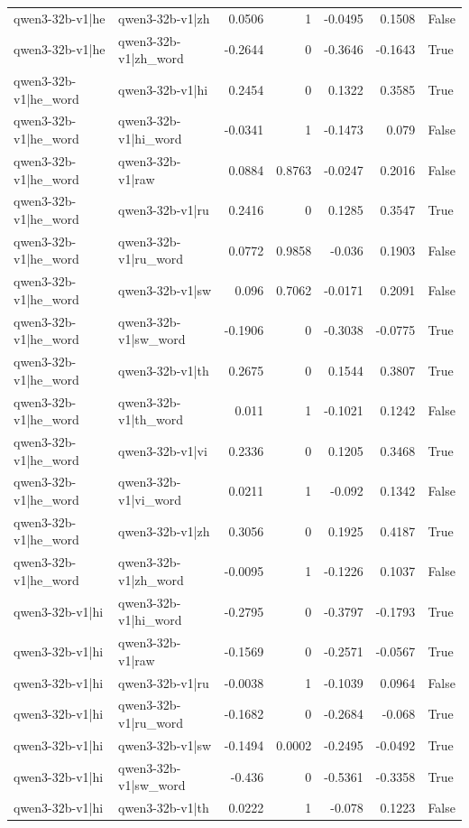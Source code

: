 \begin{table}
\begin{tabular}{l l r r r r l}
qwen3-32b-v1|he & qwen3-32b-v1|zh & 0.0506 & 1 & -0.0495 & 0.1508 & False \\
qwen3-32b-v1|he & qwen3-32b-v1|zh_word & -0.2644 & 0 & -0.3646 & -0.1643 & True \\
qwen3-32b-v1|he_word & qwen3-32b-v1|hi & 0.2454 & 0 & 0.1322 & 0.3585 & True \\
qwen3-32b-v1|he_word & qwen3-32b-v1|hi_word & -0.0341 & 1 & -0.1473 & 0.079 & False \\
qwen3-32b-v1|he_word & qwen3-32b-v1|raw & 0.0884 & 0.8763 & -0.0247 & 0.2016 & False \\
qwen3-32b-v1|he_word & qwen3-32b-v1|ru & 0.2416 & 0 & 0.1285 & 0.3547 & True \\
qwen3-32b-v1|he_word & qwen3-32b-v1|ru_word & 0.0772 & 0.9858 & -0.036 & 0.1903 & False \\
qwen3-32b-v1|he_word & qwen3-32b-v1|sw & 0.096 & 0.7062 & -0.0171 & 0.2091 & False \\
qwen3-32b-v1|he_word & qwen3-32b-v1|sw_word & -0.1906 & 0 & -0.3038 & -0.0775 & True \\
qwen3-32b-v1|he_word & qwen3-32b-v1|th & 0.2675 & 0 & 0.1544 & 0.3807 & True \\
qwen3-32b-v1|he_word & qwen3-32b-v1|th_word & 0.011 & 1 & -0.1021 & 0.1242 & False \\
qwen3-32b-v1|he_word & qwen3-32b-v1|vi & 0.2336 & 0 & 0.1205 & 0.3468 & True \\
qwen3-32b-v1|he_word & qwen3-32b-v1|vi_word & 0.0211 & 1 & -0.092 & 0.1342 & False \\
qwen3-32b-v1|he_word & qwen3-32b-v1|zh & 0.3056 & 0 & 0.1925 & 0.4187 & True \\
qwen3-32b-v1|he_word & qwen3-32b-v1|zh_word & -0.0095 & 1 & -0.1226 & 0.1037 & False \\
qwen3-32b-v1|hi & qwen3-32b-v1|hi_word & -0.2795 & 0 & -0.3797 & -0.1793 & True \\
qwen3-32b-v1|hi & qwen3-32b-v1|raw & -0.1569 & 0 & -0.2571 & -0.0567 & True \\
qwen3-32b-v1|hi & qwen3-32b-v1|ru & -0.0038 & 1 & -0.1039 & 0.0964 & False \\
qwen3-32b-v1|hi & qwen3-32b-v1|ru_word & -0.1682 & 0 & -0.2684 & -0.068 & True \\
qwen3-32b-v1|hi & qwen3-32b-v1|sw & -0.1494 & 0.0002 & -0.2495 & -0.0492 & True \\
qwen3-32b-v1|hi & qwen3-32b-v1|sw_word & -0.436 & 0 & -0.5361 & -0.3358 & True \\
qwen3-32b-v1|hi & qwen3-32b-v1|th & 0.0222 & 1 & -0.078 & 0.1223 & False \\

\end{tabular}
\end{table}
